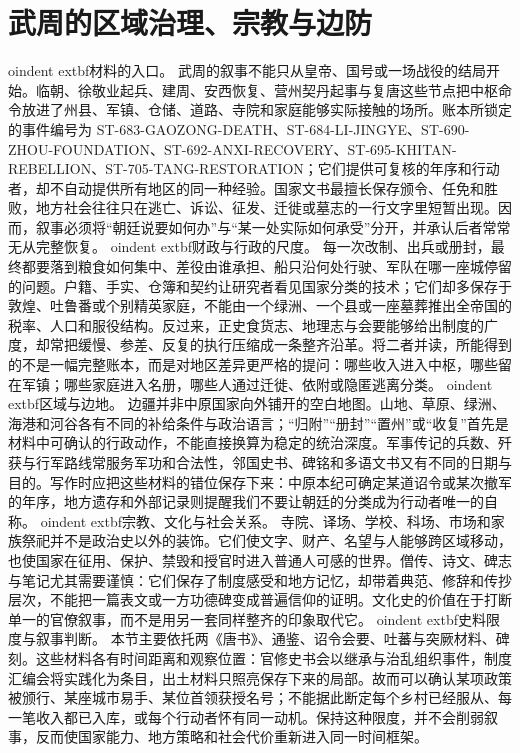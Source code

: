 \section{武周的区域治理、宗教与边防} \label{sec:wu-zhou-regional-governance}  oindent	extbf{材料的入口。} 武周的叙事不能只从皇帝、国号或一场战役的结局开始。临朝、徐敬业起兵、建周、安西恢复、营州契丹起事与复唐这些节点把中枢命令放进了州县、军镇、仓储、道路、寺院和家庭能够实际接触的场所。账本所锁定的事件编号为 ST-683-GAOZONG-DEATH、ST-684-LI-JINGYE、ST-690-ZHOU-FOUNDATION、ST-692-ANXI-RECOVERY、ST-695-KHITAN-REBELLION、ST-705-TANG-RESTORATION；它们提供可复核的年序和行动者，却不自动提供所有地区的同一种经验。国家文书最擅长保存颁令、任免和胜败，地方社会往往只在逃亡、诉讼、征发、迁徙或墓志的一行文字里短暂出现。因而，叙事必须将“朝廷说要如何办”与“某一处实际如何承受”分开，并承认后者常常无从完整恢复。   oindent	extbf{财政与行政的尺度。} 每一次改制、出兵或册封，最终都要落到粮食如何集中、差役由谁承担、船只沿何处行驶、军队在哪一座城停留的问题。户籍、手实、仓簿和契约让研究者看见国家分类的技术；它们却多保存于敦煌、吐鲁番或个别精英家庭，不能由一个绿洲、一个县或一座墓葬推出全帝国的税率、人口和服役结构。反过来，正史食货志、地理志与会要能够给出制度的广度，却常把缓慢、参差、反复的执行压缩成一条整齐沿革。将二者并读，所能得到的不是一幅完整账本，而是对地区差异更严格的提问：哪些收入进入中枢，哪些留在军镇；哪些家庭进入名册，哪些人通过迁徙、依附或隐匿逃离分类。   oindent	extbf{区域与边地。} 边疆并非中原国家向外铺开的空白地图。山地、草原、绿洲、海港和河谷各有不同的补给条件与政治语言；“归附”“册封”“置州”或“收复”首先是材料中可确认的行政动作，不能直接换算为稳定的统治深度。军事传记的兵数、歼获与行军路线常服务军功和合法性，邻国史书、碑铭和多语文书又有不同的日期与目的。写作时应把这些材料的错位保存下来：中原本纪可确定某道诏令或某次撤军的年序，地方遗存和外部记录则提醒我们不要让朝廷的分类成为行动者唯一的自称。   oindent	extbf{宗教、文化与社会关系。} 寺院、译场、学校、科场、市场和家族祭祀并不是政治史以外的装饰。它们使文字、财产、名望与人能够跨区域移动，也使国家在征用、保护、禁毁和授官时进入普通人可感的世界。僧传、诗文、碑志与笔记尤其需要谨慎：它们保存了制度感受和地方记忆，却带着典范、修辞和传抄层次，不能把一篇表文或一方功德碑变成普遍信仰的证明。文化史的价值在于打断单一的官僚叙事，而不是用另一套同样整齐的印象取代它。   oindent	extbf{史料限度与叙事判断。} 本节主要依托两《唐书》、通鉴、诏令会要、吐蕃与突厥材料、碑刻。这些材料各有时间距离和观察位置：官修史书会以继承与治乱组织事件，制度汇编会将实践化为条目，出土材料只照亮保存下来的局部。故而可以确认某项政策被颁行、某座城市易手、某位首领获授名号；不能据此断定每个乡村已经服从、每一笔收入都已入库，或每个行动者怀有同一动机。保持这种限度，并不会削弱叙事，反而使国家能力、地方策略和社会代价重新进入同一时间框架。  